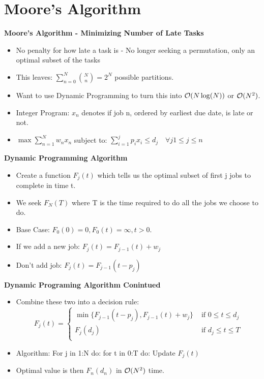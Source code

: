 \documentclass[grey,handout]{beamer}
\renewcommand{\frametitle}[1]{\begin{center}\textbf{#1}\end{center}}
\def\BigO{{\cal O}}
\begin{document}
\section{Moore's Algorithm}

\begin{frame}
  \frametitle{Moore's Algorithm - Minimizing Number of Late Tasks}
  \begin{itemize}
    \item No penalty for how late a task is - No longer seeking a permutation,
      only an optimal subset of the tasks
    \item This leaves: $\sum_{n=0}^N \binom{ N}{n} = 2^N$ possible partitions.
    \item Want to use Dynamic Programming to turn this into $\BigO( N \log(N) )$
      or $\BigO( N^2 )$.
    \item Integer Program: $x_n$ denotes if job n, ordered by earliest due date,
      is late or not.
    \item $\max \sum_{n=1}^N w_n x_n$ subject to: $\sum_{i=1}^j p_i x_i \leq d_j \quad \forall j 1 \leq j
      \leq n$
 \end{itemize}
\end{frame}

\begin{frame}
  \frametitle{Dynamic Programming Algorithm}
  \begin{itemize}
    \item Create a function $F_j(t)$ which tells us the optimal subset of first
      j jobs to complete in time t.
    \item We seek $F_N(T)$ where T is the time
      required to do all the jobs we choose to do.
    \item Base Case: $F_0(0) = 0, F_0(t) = \infty, t > 0$.
    \item If we add a new job: $F_j(t)= F_{j-1}(t) + w_j$
    \item Don't add job: $F_j(t) = F_{j-1}(t - p_j)$
  \end{itemize}
\end{frame}

\begin{frame}
  \frametitle{Dynamic Programing Algorithm Conintued}
  \begin{itemize}
  \item Combine these two into a decision rule: $$F_j(t) = 
    \begin{cases} \min \{ F_{j-1}(t-p_j), F_{j-1}(t) + w_j \} & \text{ if } 0 \leq t \le
      d_j\\
      F_j(d_j) & \text{ if } d_j \le t \le T\\
    \end{cases}$$
  \item Algorithm: For j in 1:N do:\newline
    for t in 0:T do:\newline
    Update $F_j(t)$
  \item Optimal value is then $F_n(d_n)$ in $\BigO( N^2)$ time.
  \end{itemize}
\end{frame}
\end{document}
